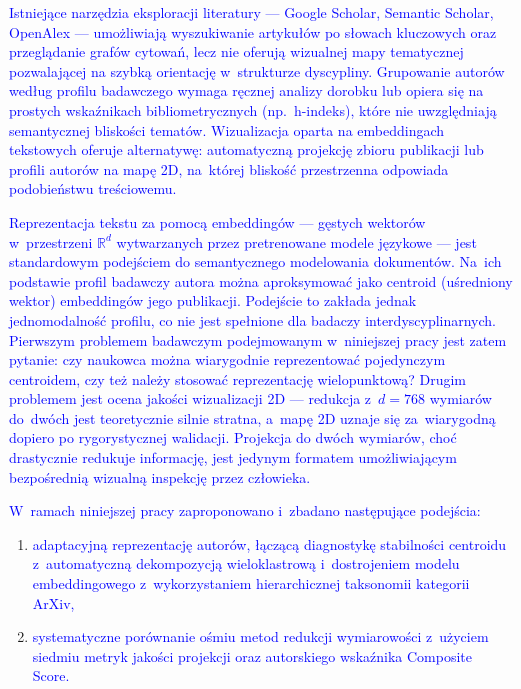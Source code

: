 \documentclass[a4paper,11pt,twocolumn]{article}
\newcommand{\hl}[1]{\textcolor{blue}{#1}}
\begin{document}
\hl{Istniejące narzędzia eksploracji literatury --- Google Scholar,
Semantic Scholar, OpenAlex --- umożliwiają wyszukiwanie artykułów
po słowach kluczowych oraz przeglądanie grafów cytowań, lecz nie
oferują wizualnej mapy tematycznej pozwalającej na szybką orientację
w~strukturze dyscypliny. Grupowanie autorów według profilu badawczego
wymaga ręcznej analizy dorobku lub opiera się na prostych wskaźnikach
bibliometrycznych (np.~h-indeks), które nie uwzględniają semantycznej
bliskości tematów. Wizualizacja oparta na embeddingach tekstowych
oferuje alternatywę: automatyczną projekcję zbioru publikacji lub
profili autorów na mapę 2D, na~której bliskość przestrzenna odpowiada
podobieństwu treściowemu.}

\hl{Reprezentacja tekstu za pomocą embeddingów --- gęstych wektorów
w~przestrzeni $\mathbb{R}^d$ wytwarzanych przez pretrenowane modele
językowe --- jest standardowym podejściem do semantycznego modelowania
dokumentów. Na~ich podstawie profil badawczy autora można aproksymować
jako centroid (uśredniony wektor) embeddingów jego publikacji. Podejście
to zakłada jednak jednomodalność profilu, co nie jest spełnione
dla badaczy interdyscyplinarnych. Pierwszym problemem badawczym
podejmowanym w~niniejszej pracy jest zatem pytanie: czy naukowca
można wiarygodnie reprezentować pojedynczym centroidem, czy też
należy stosować reprezentację wielopunktową? Drugim problemem jest
ocena jakości wizualizacji 2D --- redukcja z~$d=768$ wymiarów do~dwóch
jest teoretycznie silnie stratna, a~mapę 2D uznaje się za~wiarygodną
dopiero po rygorystycznej walidacji. Projekcja do dwóch wymiarów,
choć drastycznie redukuje informację, jest jedynym formatem
umożliwiającym bezpośrednią wizualną inspekcję przez człowieka.}

\hl{W~ramach niniejszej pracy zaproponowano i~zbadano następujące
podejścia:}
\begin{enumerate}
  \item \hl{adaptacyjną reprezentację autorów, łączącą diagnostykę
        stabilności centroidu z~automatyczną dekompozycją
        wieloklastrową i~dostrojeniem modelu embeddingowego
        z~wykorzystaniem hierarchicznej taksonomii kategorii ArXiv,}
  \item \hl{systematyczne porównanie ośmiu metod redukcji wymiarowości
        z~użyciem siedmiu metryk jakości
        projekcji oraz autorskiego wskaźnika Composite Score.}
\end{enumerate}
\end{document}
